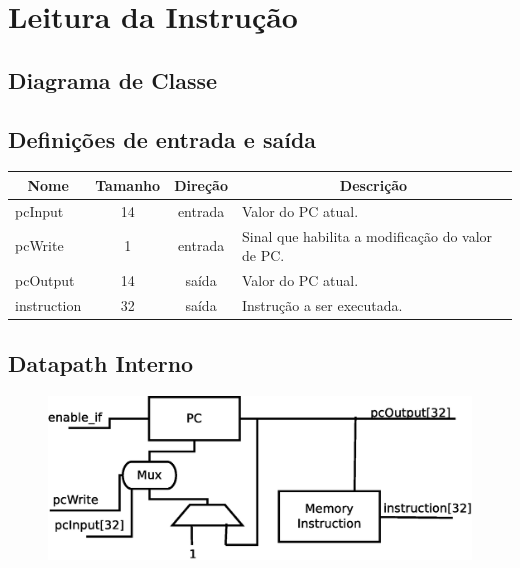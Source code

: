 \section{Leitura da Instrução}
	\subsection{Diagrama de Classe}
  \begin{figure}[H]
    
  \end{figure}
		
		\subsection{Definições de entrada e saída}
		
	\begin{center}
		\begin{longtable}[pos]{| l | c | c | m{7cm} |} \hline
			\multicolumn{1}{|c|}{\cellcolor[gray]{0.9}\textbf{Nome}} & 
			\multicolumn{1}{c|}{\cellcolor[gray]{0.9}\textbf{Tamanho}} & 
			\multicolumn{1}{c|}{\cellcolor[gray]{0.9}\textbf{Direção}} &
			\multicolumn{1}{c|}{\cellcolor[gray]{0.9}\textbf{Descrição}} \\ \hline
			\endhead
			\hline
			\endlastfoot
			pcInput & 14 & entrada & Valor do PC atual.\\ \hline
			pcWrite & 1 & entrada & Sinal que habilita a modificação do valor de PC. \\ \hline
			pcOutput & 14 & saída & Valor do PC atual. \\ \hline
			instruction & 32 & saída & Instrução a ser executada. \\ \hline
			
		\end{longtable}
	\end{center}
	
	\subsection{Datapath Interno}
	\begin{figure}
		\begin{center}
		\includegraphics[scale=0.5]{./datapath/step1.eps}
		\end{center}
	\end{figure}